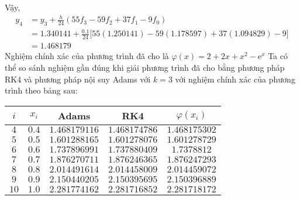 Vậy,
\begin{align*}
	y_4&=y_3+\frac{h}{24}(55f_3-59f_2+37f_1-9f_0)\\
	   &=1.340141+\frac{0.1}{24}\big[55(1.250141)-59(1.178597)+37(1.094829)-9\big]\\
	   &=1.468179
\end{align*}
Nghiệm chính xác của phương trình đã cho là $\varphi(x)=2+2x+x^2-\mathrm{e}^{x}$
Ta có thể so sánh nghiệm gần đúng khi giải phương trình đã cho bằng phương pháp RK4 và phương pháp nội suy Adams với $k=3$ với nghiệm chính xác của phương trình theo bảng sau:\par

\begin{center}\begin{tabular}{|c|c|c|c|c|}\hline
	$i$  & $x_i$ & Adams         & RK4           & $\varphi(x_i)$ \\ \hline
	$4$  & $0.4$ & $1.468179116$ & $1.468174786$ & $1.468175302$  \\ \hline
	$5$  & $0.5$ & $1.601288165$ & $1.601278076$ & $1.601278729$  \\ \hline
	$6$  & $0.6$ & $1.737896991$ & $1.737880409$ & $1.7378812$    \\ \hline
	$7$  & $0.7$ & $1.876270711$ & $1.876246365$ & $1.876247293$  \\ \hline
	$8$  & $0.8$ & $2.014491614$ & $2.014458009$ & $2.014459072$  \\ \hline
	$9$  & $0.9$ & $2.150440205$ & $2.150395695$ & $2.150396889$  \\ \hline
	$10$ & $1.0$ & $2.281774162$ & $2.281716852$ & $2.281718172$  \\ \hline
\end{tabular}\end{center}
